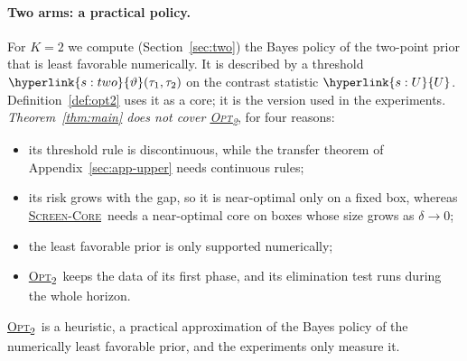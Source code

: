 \documentclass[11pt]{article}
\newcommand{\dt}[1]{\hypertarget{#1}{}}
\DeclareRobustCommand{\sy}[2]{{\hyperlink{#1}{#2}}}
\newcommand{\1}{\mathbf{1}}
\newcommand{\SC}{\sy{alg:sc}{\textsc{Screen-Core}}}
\newcommand{\OPT}{\sy{alg:opt}{\textsc{Opt}\textsubscript{2}}}
\newcommand{\Ud}{\sy{s:U}{U}}
\newcommand{\thr}{\sy{s:two}{\vartheta}}
\begin{document}
\paragraph{Two arms: a practical policy.}\dt{alg:opt} For $K=2$ we compute (Section~\ref{sec:two}) the Bayes policy of the two-point prior that is least favorable
numerically. It is described by a threshold $\thr(\tau_1,\tau_2)$ on the contrast statistic $\Ud$. Definition~\ref{def:opt2} uses it as a core; it is the version used in the
experiments. \emph{Theorem~\ref{thm:main} does not cover \OPT}, for four reasons:
\begin{itemize}
\item its threshold rule is discontinuous, while the transfer theorem of Appendix~\ref{sec:app-upper} needs continuous rules;
\item its risk grows with the gap, so it is near-optimal only on a fixed box, whereas \SC\ needs a near-optimal core on boxes whose size grows as $\delta\to0$;
\item the least favorable prior is only supported numerically;
\item \OPT\ keeps the data of its first phase, and its elimination test runs during the whole horizon.
\end{itemize}
\OPT\ is a heuristic, a practical approximation of the Bayes policy of the numerically least favorable prior, and the experiments only measure it.
\end{document}
